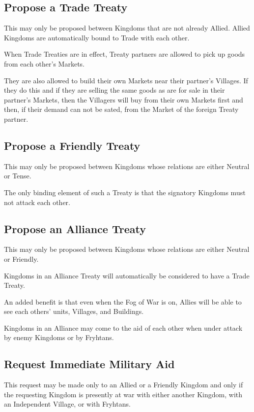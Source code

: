 \subsection{Propose a Trade Treaty}

This may only be proposed between Kingdoms that are not already Allied. Allied Kingdoms are automatically bound to Trade with each other.

When Trade Treaties are in effect, Treaty partners are allowed to pick up goods from each other’s Markets.

They are also allowed to build their own Markets near their partner’s Villages. If they do this and if they are selling the same goods as are for sale in their partner’s Markets, then the Villagers will buy from their own Markets first and then, if their demand can not be sated, from the Market of the foreign Treaty partner.

\subsection{Propose a Friendly Treaty}

This may only be proposed between Kingdoms whose relations are either Neutral or Tense.

The only binding element of such a Treaty is that the signatory Kingdoms must not attack each other.

\subsection{Propose an Alliance Treaty}


This may only be proposed between Kingdoms whose relations are either Neutral or Friendly.

Kingdoms in an Alliance Treaty will automatically be considered to have a Trade Treaty.

An added benefit is that even when the Fog of War is on, Allies will be able to see each others’ units, Villages, and Buildings.

Kingdoms in an Alliance may come to the aid of each other when under attack by enemy Kingdoms or by Fryhtans.

\subsection{Request Immediate Military Aid}

This request may be made only to an Allied or a Friendly Kingdom and only if the requesting Kingdom is presently at war with either another Kingdom, with an Independent Village, or with Fryhtans.

